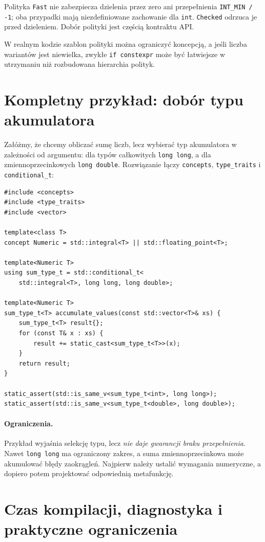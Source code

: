 Polityka \texttt{Fast} nie zabezpiecza dzielenia przez zero ani
przepełnienia \texttt{INT\_MIN / -1}; oba przypadki mają
niezdefiniowane zachowanie dla \texttt{int}. \texttt{Checked}
odrzuca je przed dzieleniem. Dobór polityki jest częścią kontraktu API.

W realnym kodzie szablon polityki można ograniczyć koncepcją, a jeśli
liczba wariantów jest niewielka, zwykłe \texttt{if constexpr} może być
łatwiejsze w utrzymaniu niż rozbudowana hierarchia polityk.

\section{Kompletny przykład: dobór typu akumulatora}
\label{sec:cpp9-worked}

Załóżmy, że chcemy obliczać sumę liczb, lecz wybierać typ akumulatora
w zależności od argumentu: dla typów całkowitych \texttt{long long},
a dla zmiennoprzecinkowych \texttt{long double}. Rozwiązanie łączy
\texttt{concepts}, \texttt{type\_traits} i \texttt{conditional\_t}:

\begin{lstlisting}
#include <concepts>
#include <type_traits>
#include <vector>

template<class T>
concept Numeric = std::integral<T> || std::floating_point<T>;

template<Numeric T>
using sum_type_t = std::conditional_t<
    std::integral<T>, long long, long double>;

template<Numeric T>
sum_type_t<T> accumulate_values(const std::vector<T>& xs) {
    sum_type_t<T> result{};
    for (const T& x : xs) {
        result += static_cast<sum_type_t<T>>(x);
    }
    return result;
}

static_assert(std::is_same_v<sum_type_t<int>, long long>);
static_assert(std::is_same_v<sum_type_t<double>, long double>);
\end{lstlisting}

\paragraph{Ograniczenia.}
Przykład wyjaśnia selekcję typu, lecz \emph{nie daje gwarancji
braku przepełnienia}. Nawet \texttt{long long} ma ograniczony zakres,
a suma zmiennoprzecinkowa może akumulować błędy zaokrągleń.
Najpierw należy ustalić wymagania numeryczne, a dopiero potem
projektować odpowiednią metafunkcję.

\section{Czas kompilacji, diagnostyka i praktyczne ograniczenia}

